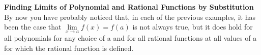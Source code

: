 \begin{comment}
\begin{example}
Evaluate the following limit: \(\lim\limits_{x \to 0} \displaystyle \frac{x^2+5x+6}{x^2+3x+2}\)
    \begin{sol}
    3
    \end{sol}
    \begin{solL}
    Let \(f(x)=\sqrt{25-x^2}\). So, $\lim\limits_{x \to -1} f(x)=f(4)=\sqrt{25-4^2}=3$.
    
    \end{solL}
    
\end{example}
\vspace{1.2 in}
\end{comment}
\begin{comment}
\subsection*{Some Techniques for Finding Limits using Formulas (Algebra Method)}
\begin{itemize}
    \item Limits of Some Very Nice Functions:  Substitution (see \cite{Hoffman}; pg.88).
    \item Limits of Polynomial and Rational Functions
    \item Limit of Other Combinations of Function (see \cite{Hoffman}; pg.88).
    \item Calculating a Limit When \(\frac{f(x)}{g(x)}\) has the indeterminate form \(\frac{0}{0}\) (\cite{openstax};page 164)
\end{itemize}
\end{comment}

\noindent \textbf{Finding Limits of Polynomial and Rational Functions by Substitution}\\
\noindent By now you have probably noticed that, in each of the previous examples, it has been the case that \(\lim\limits_{x \to a} f(x)=f(a)\) is not always true, but it does hold for all polynomials for any choice of a and for all rational functions at all values of a for which the rational function is defined.\\%

